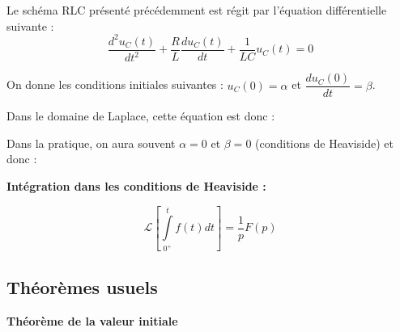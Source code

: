 \documentclass[11pt,oneside]{article}
\begin{document}
\begin{exemple}
Le schéma RLC présenté précédemment est régit par l'équation différentielle suivante : 
$$
\dfrac{d^2u_C(t)}{dt^2} +\dfrac{R}{L} \dfrac{du_C(t)}{dt} + \dfrac{1}{LC}u_C(t)=0 
$$ 

On donne les conditions initiales suivantes : $u_C(0)=\alpha$ et $\dfrac{du_C(0)}{dt} = \beta$.

Dans le domaine de Laplace, cette équation est donc : 


Dans la pratique, on aura souvent $\alpha=0$ et $\beta=0$ (conditions de Heaviside) et donc :

\end{exemple}

\begin{prop}
\textbf{Intégration dans les conditions de Heaviside :}

$$\mathcal{L}\left[ \int\limits_{0^{+}}^t f(t) dt \right] = \dfrac{1}{p} F(p)$$

\end{prop}

\subsection{Théorèmes usuels}


\begin{theo}
\textbf{Théorème de la valeur initiale}

\end{theo}
\end{document}
